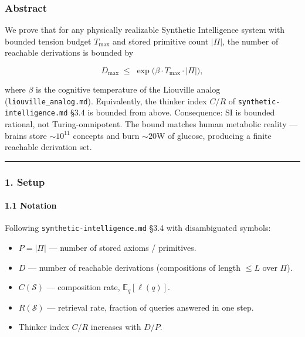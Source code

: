 \documentclass[
  11pt,
  a4paper,
]{article}
\providecommand{\tightlist}{%
  \setlength{\itemsep}{0pt}\setlength{\parskip}{0pt}}
\begin{document}
\subsubsection{Abstract}\label{abstract-6}

We prove that for any physically realizable Synthetic Intelligence
system with bounded tension budget \(T_\text{max}\) and stored primitive
count \(|\Pi|\), the number of reachable derivations is bounded by

\[
D_\text{max} \;\leq\; \exp\!\big(\beta \cdot T_\text{max} \cdot |\Pi|\big),
\]

where \(\beta\) is the cognitive temperature of the Liouville analog
(\texttt{liouville\_analog.md}). Equivalently, the thinker index \(C/R\)
of \texttt{synthetic-intelligence.md} §3.4 is bounded from above.
Consequence: SI is bounded rational, not Turing-omnipotent. The bound
matches human metabolic reality --- brains store \(\sim 10^{11}\)
concepts and burn \(\sim 20\)W of glucose, producing a finite reachable
derivation set.

\begin{center}\rule{0.5\linewidth}{0.5pt}\end{center}

\subsubsection{1. Setup}\label{setup-3}

\paragraph{1.1 Notation}\label{notation}

Following \texttt{synthetic-intelligence.md} §3.4 with disambiguated
symbols:

\begin{itemize}
\tightlist
\item
  \(P = |\Pi|\) --- number of stored axioms / primitives.
\item
  \(D\) --- number of reachable derivations (compositions of length
  \(\leq L\) over \(\Pi\)).
\item
  \(C(\mathcal{S})\) --- composition rate, \(\mathbb{E}_q[\ell(q)]\).
\item
  \(R(\mathcal{S})\) --- retrieval rate, fraction of queries answered in
  one step.
\item
  Thinker index \(C/R\) increases with \(D/P\).
\end{itemize}
\end{document}
